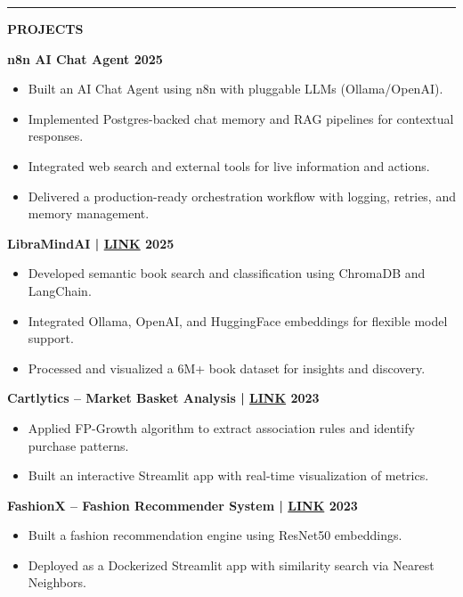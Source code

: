 \documentclass[11pt,a4paper]{article}
\newcommand{\link}[1]{\href{#1}{LINK}}
\newcommand{\resumesection}[1]{
	\vspace{0.2cm}
	\hrule
	\vspace{0.2cm}
	\centerline{\large\textbf{#1}}
	\vspace{0.15cm}
}
\begin{document}
	
	\resumesection{PROJECTS}
	\noindent \textbf{n8n AI Chat Agent \hfill 2025} 
	\begin{itemize}
		\item Built an AI Chat Agent using n8n with pluggable LLMs (Ollama/OpenAI).
		\item Implemented Postgres-backed chat memory and RAG pipelines for contextual responses.
		\item Integrated web search and external tools for live information and actions.
		\item Delivered a production-ready orchestration workflow with logging, retries, and memory management.
	\end{itemize}
	
	\vspace{0.1cm}
	\noindent \textbf{LibraMindAI | \link{https://github.com/ValupadasuSaiabbhiram/LibraMindAI} \hfill 2025} 
	\begin{itemize}
		\item Developed semantic book search and classification using ChromaDB and LangChain.
		\item Integrated Ollama, OpenAI, and HuggingFace embeddings for flexible model support.
		\item Processed and visualized a 6M+ book dataset for insights and discovery.
	\end{itemize}
	
	\vspace{0.1cm}
	\noindent \textbf{Cartlytics – Market Basket Analysis | \link{https://github.com/ValupadasuSaiabbhiram/Cartlytics} \hfill 2023} 
	\begin{itemize}
		\item Applied FP-Growth algorithm to extract association rules and identify purchase patterns.
		\item Built an interactive Streamlit app with real-time visualization of metrics.
	\end{itemize}
	
	\vspace{0.1cm}
	\noindent \textbf{FashionX – Fashion Recommender System | \link{https://github.com/ValupadasuSaiabbhiram/FashionX} \hfill 2023} 
	\begin{itemize}
		\item Built a fashion recommendation engine using ResNet50 embeddings.
		\item Deployed as a Dockerized Streamlit app with similarity search via Nearest Neighbors.
	\end{itemize}
	
\end{document}

